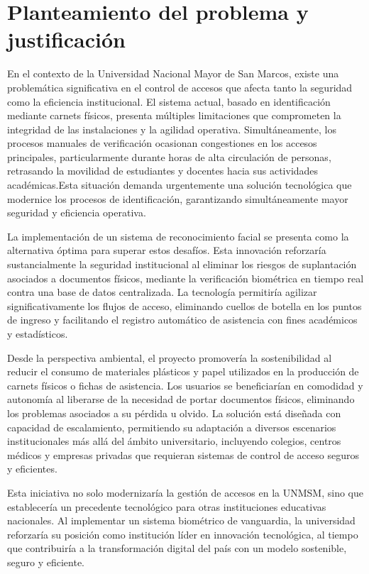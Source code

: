\documentclass[12pt]{article}
\begin{document}
{%
\section{Planteamiento del problema y justificación}
En el contexto de la Universidad Nacional Mayor de San Marcos, existe una problemática significativa en el control de accesos que afecta tanto la seguridad como la eficiencia institucional. El sistema actual, basado en identificación mediante carnets físicos, presenta múltiples limitaciones que comprometen la integridad de las instalaciones y la agilidad operativa. Simultáneamente, los procesos manuales de verificación ocasionan congestiones en los accesos principales, particularmente durante horas de alta circulación de personas, retrasando la movilidad de estudiantes y docentes hacia sus actividades académicas.Esta situación demanda urgentemente una solución tecnológica que modernice los procesos de identificación, garantizando simultáneamente mayor seguridad y eficiencia operativa.

La implementación de un sistema de reconocimiento facial se presenta como la alternativa óptima para superar estos desafíos. Esta innovación reforzaría sustancialmente la seguridad institucional al eliminar los riesgos de suplantación asociados a documentos físicos, mediante la verificación biométrica en tiempo real contra una base de datos centralizada. La tecnología permitiría agilizar significativamente los flujos de acceso, eliminando cuellos de botella en los puntos de ingreso y facilitando el registro automático de asistencia con fines académicos y estadísticos.

Desde la perspectiva ambiental, el proyecto promovería la sostenibilidad al reducir el consumo de materiales plásticos y papel utilizados en la producción de carnets físicos o fichas de asistencia. Los usuarios se beneficiarían en comodidad y autonomía al liberarse de la necesidad de portar documentos físicos, eliminando los problemas asociados a su pérdida u olvido. La solución está diseñada con capacidad de escalamiento, permitiendo su adaptación a diversos escenarios institucionales más allá del ámbito universitario, incluyendo colegios, centros médicos y empresas privadas que requieran sistemas de control de acceso seguros y eficientes.

Esta iniciativa no solo modernizaría la gestión de accesos en la UNMSM, sino que establecería un precedente tecnológico para otras instituciones educativas nacionales. Al implementar un sistema biométrico de vanguardia, la universidad reforzaría su posición como institución líder en innovación tecnológica, al tiempo que contribuiría a la transformación digital del país con un modelo sostenible, seguro y eficiente.

}
\end{document}
